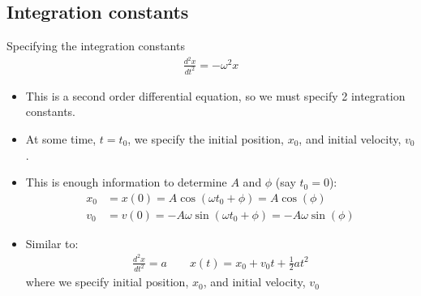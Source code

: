 \documentclass[aspectratio=169,
hyperref={colorlinks,urlcolor=blue}
]{beamer}
\begin{document}
\subsection{Integration constants}
\label{subsec:integrationconstants}
\begin{frame}{Specifying the integration constants}
\begin{align*}
\frac{d^2x}{dt^2}=-\omega^2 x
\end{align*}
\begin{itemize}
\item This is a second order differential equation, so we must specify 2 integration constants.
\item At some time, $t=t_0$, we specify the initial position, $x_0$, and initial velocity, $v_0$.
\item This is enough information to determine $A$ and $\phi$  (say $t_0=0$):
\begin{align*}
x_0&=x(0)=A\cos(\omega t_0 +\phi)=A\cos(\phi)\\
v_0&=v(0)=-A\omega\sin(\omega t_0 +\phi)=-A\omega\sin(\phi)
\end{align*}
\item Similar to:
\begin{align*}
\frac{d^2x}{dt^2}=a \quad\quad x(t)=x_0+v_0t+\frac{1}{2}at^2
\end{align*}
where we specify initial position, $x_0$, and initial velocity, $v_0$
\end{itemize}

\end{frame}







\end{document}
